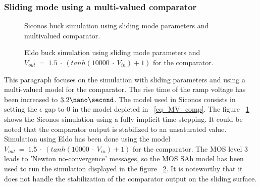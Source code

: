 \subsubsection{Sliding mode using a multi-valued comparator}
\begin{figure}[!ht]
     \hspace{-2mm}
  \caption{{\sc Siconos} buck simulation using sliding mode parameters and multivalued comparator.}
\label{fig:figSimuBuck_Sliding_mv}
\end{figure}

\begin{figure}[!ht]
     \hspace{-2mm}
  \caption{{\sc Eldo} buck simulation using sliding mode parameters and $V_{out}~=~1.5~\cdot~(tanh(10000~\cdot~V_{in}) + 1)$ for the comparator.}
\label{fig:figSimuBuck_Sliding_mv_eldo}
\end{figure}
This paragraph focuses on the simulation with sliding parameters and using a multi-valued model for the comparator. The rise
time of the ramp voltage has been increased to $3.2 \nano \second$. The model used in {\sc Siconos}
consists in setting the $\epsilon$ gap to $0$ in the model depicted in ~\ref{eq_MV_comp}. The figure
~\ref{fig:figSimuBuck_Sliding_mv} shows the {\sc Siconos} simulation using a fully implicit time-stepping. It could be noted that
the comparator output is stabilized to an unsaturated value. Simulation using {\sc Eldo} has been
done using the model $V_{out}~=~1.5~\cdot~(tanh(10000~\cdot~V_{in}) + 1)$ for the comparator. The MOS
level 3 leads to 'Newton no-convergence' messages, so the MOS SAh model has been used to run the simulation displayed in the figure ~\ref{fig:figSimuBuck_Sliding_mv_eldo}.
It is noteworthy that it does not handle the stabilization of the comparator output on the sliding surface. 





